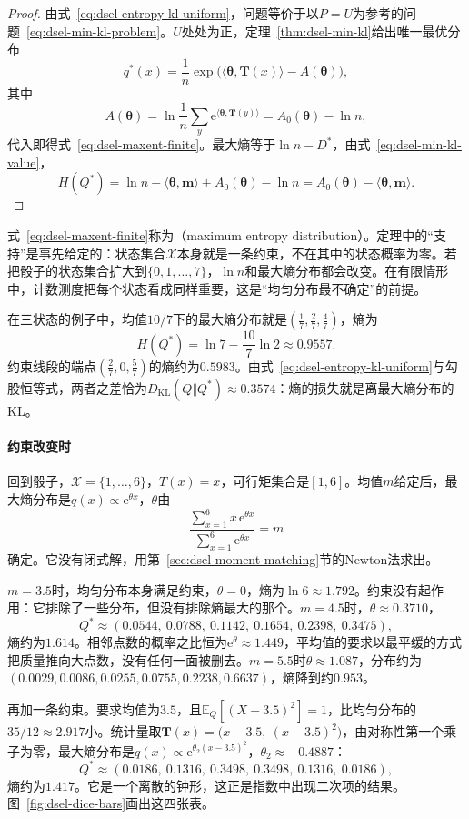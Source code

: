 \begin{proof}
由式~\eqref{eq:dsel-entropy-kl-uniform}，问题等价于以$P=U$为参考的问题~\eqref{eq:dsel-min-kl-problem}。$U$处处为正，定理~\ref{thm:dsel-min-kl}给出唯一最优分布
\[
 q^{*}(x)=\frac1n\exp\bigl(\langle\bm{\theta},\bm{T}(x)\rangle-A(\bm{\theta})\bigr),
\]
其中
\[
 A(\bm{\theta})=\ln\frac1n\sum_y\mathrm{e}^{\langle\bm{\theta},\bm{T}(y)\rangle}=A_0(\bm{\theta})-\ln n ,
\]
代入即得式~\eqref{eq:dsel-maxent-finite}。最大熵等于$\ln n-D^{*}$，由式~\eqref{eq:dsel-min-kl-value}，
\[
 H(Q^{*})=\ln n-\langle\bm{\theta},\bm{m}\rangle+A_0(\bm{\theta})-\ln n=A_0(\bm{\theta})-\langle\bm{\theta},\bm{m}\rangle .
\]
\end{proof}

式~\eqref{eq:dsel-maxent-finite}称为（maximum entropy distribution）。定理中的“支持”是事先给定的：状态集合$\mathcal{X}$本身就是一条约束，不在其中的状态概率为零。若把骰子的状态集合扩大到$\{0,1,\dots,7\}$，$\ln n$和最大熵分布都会改变。在有限情形中，计数测度把每个状态看成同样重要，这是“均匀分布最不确定”的前提。

在三状态的例子中，均值$10/7$下的最大熵分布就是$(\tfrac17,\tfrac27,\tfrac47)$，熵为
\[
 H(Q^{*})=\ln7-\frac{10}{7}\ln2\approx0.9557 .
\]
约束线段的端点$(\tfrac27,0,\tfrac57)$的熵约为$0.5983$。由式~\eqref{eq:dsel-entropy-kl-uniform}与勾股恒等式，两者之差恰为$D_{\mathrm{KL}}(Q\Vert Q^{*})\approx0.3574$：熵的损失就是离最大熵分布的KL。

\paragraph{约束改变时}
回到骰子，$\mathcal{X}=\{1,\dots,6\}$，$T(x)=x$，可行矩集合是$[1,6]$。均值$m$给定后，最大熵分布是$q(x)\propto\mathrm{e}^{\theta x}$，$\theta$由
\[
 \frac{\sum_{x=1}^{6}x\,\mathrm{e}^{\theta x}}{\sum_{x=1}^{6}\mathrm{e}^{\theta x}}=m
\]
确定。它没有闭式解，用第~\ref{sec:dsel-moment-matching}节的Newton法求出。

$m=3.5$时，均匀分布本身满足约束，$\theta=0$，熵为$\ln6\approx1.792$。约束没有起作用：它排除了一些分布，但没有排除熵最大的那个。$m=4.5$时，$\theta\approx0.3710$，
\[
 Q^{*}\approx(0.0544,\ 0.0788,\ 0.1142,\ 0.1654,\ 0.2398,\ 0.3475),
\]
熵约为$1.614$。相邻点数的概率之比恒为$\mathrm{e}^{\theta}\approx1.449$，平均值的要求以最平缓的方式把质量推向大点数，没有任何一面被删去。$m=5.5$时$\theta\approx1.087$，分布约为$(0.0029,0.0086,0.0255,0.0755,0.2238,0.6637)$，熵降到约$0.953$。

再加一条约束。要求均值为$3.5$，且$\mathbb{E}_{Q}[(X-3.5)^{2}]=1$，比均匀分布的$35/12\approx2.917$小。统计量取$\bm{T}(x)=\bigl(x-3.5,\ (x-3.5)^{2}\bigr)$，由对称性第一个乘子为零，最大熵分布是$q(x)\propto\mathrm{e}^{\theta_2(x-3.5)^{2}}$，$\theta_2\approx-0.4887$：
\[
 Q^{*}\approx(0.0186,\ 0.1316,\ 0.3498,\ 0.3498,\ 0.1316,\ 0.0186),
\]
熵约为$1.417$。它是一个离散的钟形，这正是指数中出现二次项的结果。图~\ref{fig:dsel-dice-bars}画出这四张表。

